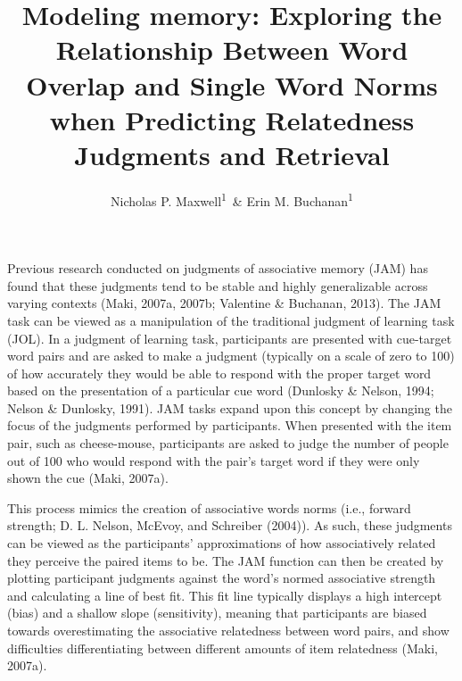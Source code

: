 \documentclass[english,man]{apa6}
\title{Modeling memory: Exploring the Relationship Between Word Overlap and
Single Word Norms when Predicting Relatedness Judgments and Retrieval}
\author{Nicholas P. Maxwell\textsuperscript{1}~\& Erin M. Buchanan\textsuperscript{1}}
\affiliation{
    \vspace{0.5cm}
          \textsuperscript{1} Missouri State University  }
\theoremstyle{definition}
\theoremstyle{definition}
\theoremstyle{remark}
\begin{document}
\maketitle

\setcounter{secnumdepth}{0}



Previous research conducted on judgments of associative memory (JAM) has
found that these judgments tend to be stable and highly generalizable
across varying contexts (Maki, 2007a, 2007b; Valentine \& Buchanan,
2013). The JAM task can be viewed as a manipulation of the traditional
judgment of learning task (JOL). In a judgment of learning task,
participants are presented with cue-target word pairs and are asked to
make a judgment (typically on a scale of zero to 100) of how accurately
they would be able to respond with the proper target word based on the
presentation of a particular cue word (Dunlosky \& Nelson, 1994; Nelson
\& Dunlosky, 1991). JAM tasks expand upon this concept by changing the
focus of the judgments performed by participants. When presented with
the item pair, such as cheese-mouse, participants are asked to judge the
number of people out of 100 who would respond with the pair's target
word if they were only shown the cue (Maki, 2007a).

This process mimics the creation of associative words norms (i.e.,
forward strength; D. L. Nelson, McEvoy, and Schreiber (2004)). As such,
these judgments can be viewed as the participants' approximations of how
associatively related they perceive the paired items to be. The JAM
function can then be created by plotting participant judgments against
the word's normed associative strength and calculating a line of best
fit. This fit line typically displays a high intercept (bias) and a
shallow slope (sensitivity), meaning that participants are biased
towards overestimating the associative relatedness between word pairs,
and show difficulties differentiating between different amounts of item
relatedness (Maki, 2007a).
\end{document}
